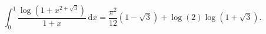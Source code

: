 %

\begin{problem}[pytanie 426325]
    \label{stack_426325}%
    \begin{equation}
        \int_0^1 \frac{\log \left(1 + x^{2 + \sqrt 3}\right)}{1 + x} \,\mathrm{d} x = \frac{\pi^2}{12} (1 - \sqrt 3) + \log (2) \log(1 + \sqrt 3).
    \end{equation}
\end{problem}

%